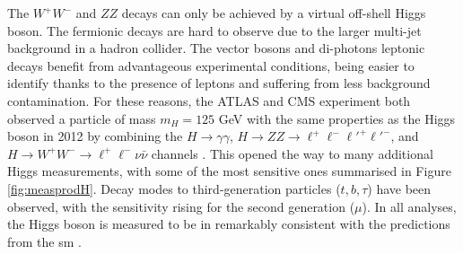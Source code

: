 The $W^+W^-$ and $ZZ$ decays can only be achieved by a virtual off-shell Higgs boson. The fermionic decays are hard to observe due to the larger multi-jet background in a hadron collider. The vector bosons and di-photons leptonic decays benefit from advantageous experimental conditions, being easier to identify thanks to the presence of leptons and suffering from less background contamination. For these reasons, the ATLAS and CMS experiment both observed a particle of mass $m_H = 125$ GeV with the same properties as the Higgs boson in 2012 by combining the $H \rightarrow \gamma\gamma$, $H \rightarrow ZZ \rightarrow \ell^+\ell^-\ell'^+\ell'^-$, and $H \rightarrow W^+W^- \rightarrow \ell^+\ell^-\nu \bar{\nu}$ channels \cite{ATLAS:2012yve, CMS:2012qbp}. This opened the way to many additional Higgs measurements, with some of the most sensitive ones summarised in Figure \ref{fig:measprodH}. Decay modes to third-generation particles ($t, b, \tau$) have been observed, with the sensitivity rising for the second generation ($\mu$). In all analyses, the Higgs boson is measured to be in remarkably consistent with the predictions from the \gls{sm} \cite{ATLAS:2022vkf}. 
